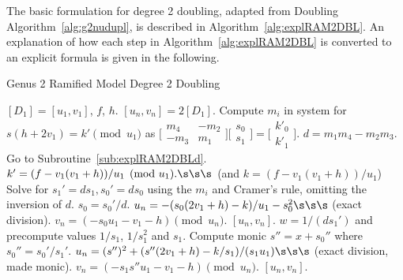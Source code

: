 The basic formulation for degree 2 doubling, adapted from Doubling
Algorithm~\ref{alg:g2nudupl}, is described in Algorithm~\ref{alg:explRAM2DBL}.
An explanation of how each step in Algorithm~\ref{alg:explRAM2DBL} is converted
to an explicit formula is given in the following.

\begin{algorithm}[htbp]
\caption{Genus 2 Ramified Model Degree 2 Doubling\label{alg:explRAM2DBL}}
\begin{algorithmic}[1]
\Require $[D_1] = [u_1,v_1]$, $f$, $h$.  \smallskip
\Ensure $[u_n,v_n] = 2[D_1]$.
\algrule
\State Compute $m_i$ in system for $s(h + 2v_1) = k' \pmod{u_1}$ as $ \bigl[
\begin{smallmatrix} m_4 & -m_2\\ -m_3 & m_1\end{smallmatrix}\bigr] \bigl[
\begin{smallmatrix} s_0\\ s_1 \end{smallmatrix} \bigr ] = \bigl[ \begin{smallmatrix}k'_0
\\  k'_1\end{smallmatrix} \bigr ]$.
\State $d = m_1m_4 - m_2m_3$.
 Go to Subroutine~\ref{sub:explRAM2DBLd}.
\EndIf
\State $k' = (f - v_1(v_1 + h))/u_1 \pmod{u_1}. \s\s\s$ (and $k = (f - v_1(v_1 + h))/u_1$)
\State Solve for $s_1' = ds_1, s_0' = ds_0$ using the $m_i$ and Cramer's rule, omitting the inversion of $d$.
    \State $s_0 = s_0'/d$.
    \State $u_n = -(s_0(2v_1 + h) - k)/u_1 - s_0^2 \s\s\s $ (exact division).
    \State $v_n = (-s_0u_1 - v_1 - h) \pmod{u_n}$.
    \State \Return $[u_n,v_n]$.
    \EndIf
\State $w = 1/(ds_1')$ and precompute values $1/s_1$, $1/s_1^2$ and $s_1$. 
\State Compute monic $s'' = x + s_0''$ where $s_0'' = s_0'/s_1'$.
\State $u_n = (s'')^2 + (s''(2v_1 + h) - k/s_1)/(s_1u_1) \s\s\s $ (exact division, made monic).
\State $v_n = (-s_1s''u_1 - v_1 - h) \pmod{u_n}$.
\State \Return $[u_n,v_n]$.
\end{algorithmic}
\end{algorithm}


